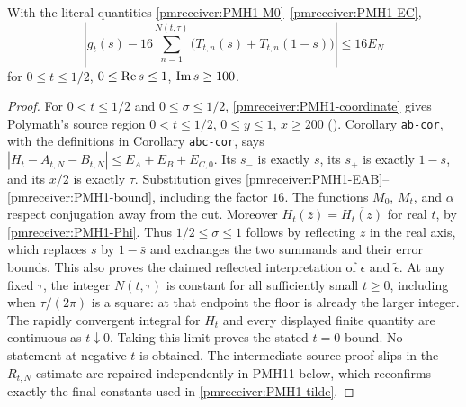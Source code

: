 \documentclass[11pt]{article}
\begin{document}
\begin{pmreceivertheorem}
\label{pmreceiver:PMH1}
With the literal quantities \eqref{pmreceiver:PMH1-M0}--\eqref{pmreceiver:PMH1-EC},
\begin{equation}\label{pmreceiver:PMH1-bound}
 \left|g_t(s)-16\sum_{n=1}^{N(t,\tau)}
       \bigl(T_{t,n}(s)+T_{t,n}(1-s)\bigr)\right|\le16E_N
\end{equation}
for $0\le t\le1/2$, $0\le\operatorname{Re} s\le1$, $\operatorname{Im} s\ge100$.
\end{pmreceivertheorem}
\begin{proof}
For $0<t\le1/2$ and $0\le\sigma\le1/2$,
\eqref{pmreceiver:PMH1-coordinate} gives Polymath's source region
$0<t\le1/2$, $0\le y\le1$, $x\ge200$ ().
Corollary \texttt{ab-cor}, with the definitions in
Corollary \texttt{abc-cor}, says
$|H_t-A_{t,N}-B_{t,N}|\le E_A+E_B+E_{C,0}$.
Its $s_-$ is exactly $s$, its $s_+$ is exactly $1-s$, and its
$x/2$ is exactly $\tau$. Substitution gives
\eqref{pmreceiver:PMH1-EAB}--\eqref{pmreceiver:PMH1-bound}, including the factor $16$.
The functions $M_0$, $M_t$, and $\alpha$ respect conjugation away
from the cut. Moreover $H_t(\bar z)=\overline{H_t(z)}$ for real $t$,
by \eqref{pmreceiver:PMH1-Phi}. Thus $1/2\le\sigma\le1$ follows by reflecting
$z$ in the real axis, which replaces $s$ by $1-\bar s$ and exchanges
the two summands and their error bounds. This also proves the claimed
reflected interpretation of $\epsilon$ and $\widetilde\epsilon$.
At any fixed $\tau$, the integer $N(t,\tau)$ is constant for all
sufficiently small $t\ge0$, including when $\tau/(2\pi)$ is a square:
at that endpoint the floor is already the larger integer.
The rapidly convergent integral for $H_t$ and every displayed finite
quantity are continuous as $t\downarrow0$. Taking this limit proves
the stated $t=0$ bound. No statement at negative $t$ is obtained.
The intermediate source-proof slips in the $R_{t,N}$ estimate are
repaired independently in PMH11 below, which reconfirms exactly
the final constants used in \eqref{pmreceiver:PMH1-tilde}.
\end{proof}
\end{document}
